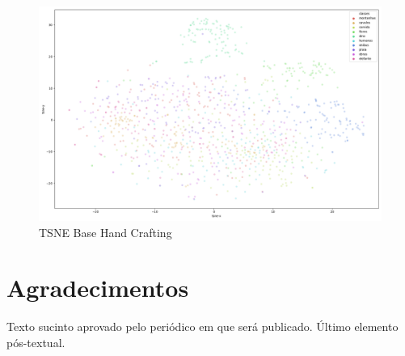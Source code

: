 \documentclass[
article,			%
11pt,				%
oneside,			%
a4paper,			%
english,			%
brazil,				%
sumario=tradicional,
]{abntex2}
\begin{document}
\begin{anexosenv}
	\begin{figure}[htb]
		\caption{\label{tsne-hand-crafting-data}TSNE Base Hand Crafting}
		\begin{center}
			\includegraphics[scale=0.3]{tsne-graph-hand-craft.png}
		\end{center}
	\end{figure}
	
	\end{anexosenv}
	
	
	\section*{Agradecimentos}
	Texto sucinto aprovado pelo periódico em que será publicado. Último 
	elemento pós-textual.
	
\end{document}
